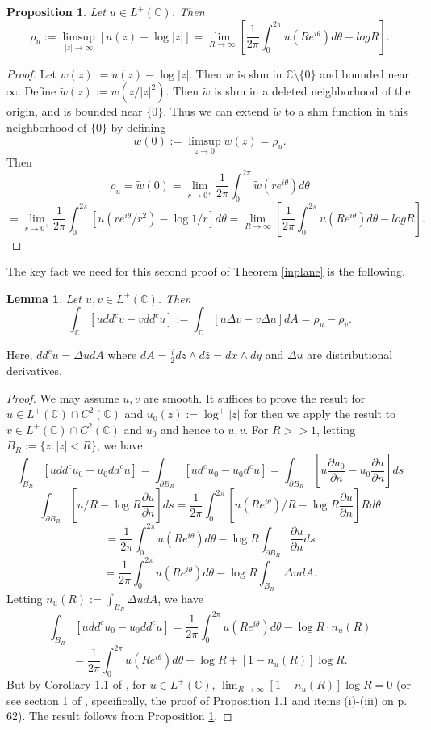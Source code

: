 \documentclass[12pt]{article}
\numberwithin{equation}{section}
\newtheorem{proposition}[theorem]{Proposition}
\newtheorem{lemma}[theorem]{Lemma}
\newcommand{\C}{\mathbb{C}}
\renewcommand{\tilde}{\widetilde}
\begin{document}
\begin{proposition} \label{robinprop} Let $u\in L^+(\C)$. Then
$$\rho_u:=\limsup_{|z|\to \infty}[u(z)-\log |z|] =\lim_{R\to \infty}  [\frac{1}{2\pi}\int_0^{2\pi}u(Re^{i\theta})d\theta -log R].$$
\end{proposition}

\begin{proof} Let $w(z):=u(z)-\log |z|$. Then $w$ is shm in $\C \setminus \{0\}$ and bounded near $\infty$. Define $\tilde w(z):=w(z/|z|^2)$. Then $\tilde w$ is shm in a deleted neighborhood of the origin, and is bounded near $\{0\}$. Thus we can extend $\tilde w$ to a shm function in this neighborhood of $\{0\}$ by defining 
$$\tilde w(0):=\limsup_{z\to 0} \tilde w(z)= \rho_u.$$
Then 
$$\rho_u=\tilde w(0) =\lim_{r\to 0^+} \frac{1}{2\pi}\int_0^{2\pi}\tilde w(re^{i\theta})d\theta$$
$$=\lim_{r\to 0^+} \frac{1}{2\pi}\int_0^{2\pi}[u(re^{i\theta}/r^2)-\log 1/r]d\theta= \lim_{R\to \infty}  [\frac{1}{2\pi}\int_0^{2\pi}u(Re^{i\theta})d\theta -log R].$$


\end{proof}

The key fact we need for this second proof of Theorem \ref{inplane} is the following.

\begin{lemma} \label{flatclemma} Let $u,v\in L^+(\C)$. Then 
$$\int_{\C} [udd^cv-vdd^cu]:=\int_{\C} [u \Delta v- v \Delta u]dA = \rho_u -\rho_v.$$
\end{lemma}

\noindent Here, $dd^cu=\Delta udA$ where $dA =\frac{i}{2}dz \wedge d\bar z=dx \wedge dy$ and $\Delta u$ are distributional derivatives.

\begin{proof} 

We may assume $u,v$ are smooth. It suffices to prove the result for $u\in L^+(\C)\cap C^2(\C)$ and $u_0(z):=\log^+|z|$ for then we apply the result to $v\in L^+(\C)\cap C^2(\C)$ and $u_0$ and hence to $u,v$. For $R>>1$, letting $B_R:=\{z: |z| <R\}$, we have 
$$\int_{B_R} [udd^cu_0-u_0dd^cu]=\int_{\partial B_R} [ud^cu_0-u_0d^cu]=\int_{\partial B_R} [u \frac{\partial u_0}{\partial n}- u_0\frac{\partial u}{\partial n}]ds$$
$$\int_{\partial B_R} [u /R- \log R \frac{\partial u}{\partial n}]ds=\frac{1}{2\pi} \int_0^{2\pi}[u(Re^{i\theta}) /R- \log R \frac{\partial u}{\partial n}]Rd\theta$$
$$=\frac{1}{2\pi} \int_0^{2\pi} u(Re^{i\theta})d\theta -\log R \int_{\partial B_R} \frac{\partial u}{\partial n}ds$$
$$=\frac{1}{2\pi} \int_0^{2\pi} u(Re^{i\theta})d\theta -\log R \int_{B_R} \Delta u dA.$$
Letting $n_u(R):= \int_{B_R} \Delta u dA$, we have
$$\int_{B_R} [udd^cu_0-u_0dd^cu]= \frac{1}{2\pi} \int_0^{2\pi} u(Re^{i\theta})d\theta -\log R \cdot n_u(R)$$
$$=\frac{1}{2\pi} \int_0^{2\pi} u(Re^{i\theta})d\theta -\log R + [1-n_u(R)]\log R.$$
But by Corollary 1.1 of \cite{L}, for $u\in L^+(\C)$, $\lim_{R\to \infty}[1-n_u(R)]\log R=0$ (or see section 1 of \cite{BLM}, specifically, the proof of Proposition 1.1 and items (i)-(iii) on p. 62). The result follows from Proposition \ref{robinprop}.


\end{proof} 
\end{document}
